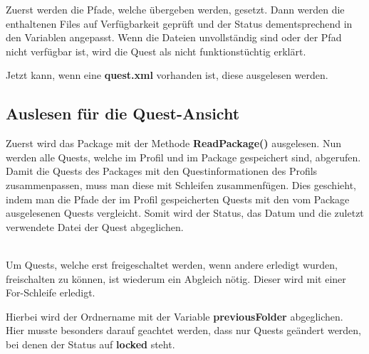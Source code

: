 Zuerst werden die Pfade, welche übergeben werden, gesetzt. Dann werden die enthaltenen Files auf Verfügbarkeit geprüft und der Status dementsprechend in den Variablen angepasst. Wenn die Dateien unvollständig sind oder der Pfad nicht verfügbar ist, wird die Quest als nicht funktionstüchtig erklärt.

Jetzt kann, wenn eine \textbf{quest.xml} vorhanden ist, diese ausgelesen werden. 


\subsection{Auslesen für die Quest-Ansicht}
Zuerst wird das Package mit der Methode \textbf{ReadPackage()} ausgelesen. Nun werden alle Quests, welche im Profil und im Package gespeichert sind, abgerufen. Damit die Quests des Packages mit den Questinformationen des Profils zusammenpassen, muss man diese mit Schleifen zusammenfügen. Dies geschieht, indem man die Pfade der im Profil gespeicherten Quests mit den vom Package ausgelesenen Quests vergleicht. Somit wird der Status, das Datum und die zuletzt verwendete Datei der Quest abgeglichen.

\\
Um Quests, welche erst freigeschaltet werden, wenn andere erledigt wurden, freischalten zu können, ist wiederum ein Abgleich nötig. Dieser wird mit einer For-Schleife erledigt. 

Hierbei wird der Ordnername mit der Variable \textbf{previousFolder} abgeglichen. Hier musste besonders darauf geachtet werden, dass nur Quests geändert werden, bei denen der Status auf \textbf{locked} steht.


